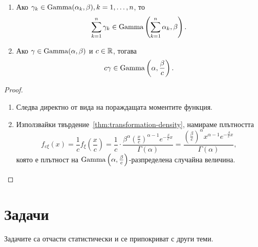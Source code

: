 \documentclass[numbers=endperiod, DIV=15, bibliography=totocnumbered]{scrartcl}
\begin{document}
\begin{proposition}\label{thm:gamma-operations}
  \mbox{}
  \begin{enumerate}
    \item Ако $\gamma_k \in \operatorname{Gamma}(\alpha_k, \beta), k = 1, \ldots, n$, то
    \begin{displaymath}
      \sum_{k=1}^n \gamma_k \in \operatorname{Gamma}\left( \sum_{k=1}^n \alpha_k, \beta \right).
    \end{displaymath}

    \item Ако $\gamma \in \operatorname{Gamma}(\alpha, \beta)$ и $c \in \mathbb{R}$, тогава
    \begin{displaymath}
      c \gamma \in \operatorname{Gamma}\left(\alpha, \frac \beta c \right).
    \end{displaymath}
  \end{enumerate}
\end{proposition}
\begin{proof}
  \mbox{}
  \begin{enumerate}
    \item Следва директно от вида на пораждащата моментите функция.
    \item Използвайки твърдение~\ref{thm:transformation-density}, намираме плътността
    \begin{displaymath}
      f_{c\xi}(x)
      =
      \frac 1 c f_\xi\left(\frac x c \right)
      =
      \frac 1 c \cdot \frac {\beta^\alpha {\left(\frac x c \right)}^{\alpha-1} e^{-\frac \beta c x}} {\Gamma(\alpha)}
      =
      \frac {{\left(\frac \beta c \right)}^\alpha x^{\alpha-1} e^{-\frac \beta c x}} {\Gamma(\alpha)},
    \end{displaymath}
    която е плътност на $\operatorname{Gamma}\left(\alpha, \frac \beta c \right)$-разпределена случайна величина.
  \end{enumerate}
\end{proof}

\section{Задачи}

Задачите са отчасти статистически и се припокриват с други теми.
\end{document}
